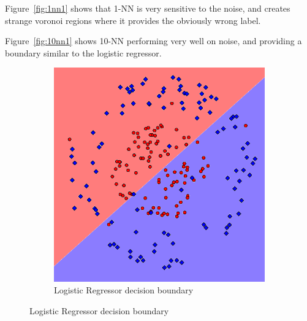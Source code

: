 \documentclass[letterpaper,10pt]{article} %
\begin{document}
Figure~\ref{fig:1nn1} shows that 1-NN is very sensitive to the noise, and creates strange voronoi regions where it provides the obviously wrong label.

Figure~\ref{fig:10nn1} shows 10-NN performing very well on noise, and providing a boundary similar to the logistic regressor.

\begin{figure}[h]
\centering
\begin{subfigure}[b]{\textwidth}
\includegraphics[width=\textwidth]{handout/q3-2-logistic}
\caption{Logistic Regressor decision boundary}
\label{fig:log2}
\end{subfigure}%


\end{figure}
\end{document}
